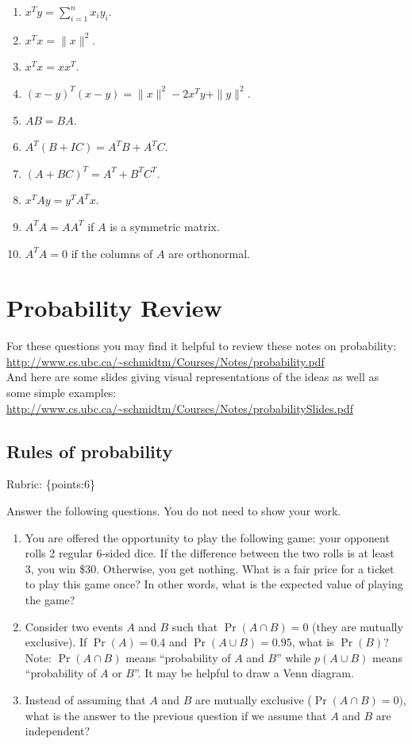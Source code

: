 \documentclass{article}
\def\rubric#1{\gre{Rubric: \{#1\}}}{}
\def\blu#1{{\color{blu}#1}}
\def\gre#1{{\color{gre}#1}}
\def\norm#1{\|#1\|}
\begin{document}
	\begin{enumerate}
		\item $x^Ty = \sum_{i=1}^n x_iy_i$.
		\item $x^Tx = \norm{x}^2$.
		\item $x^Tx = xx^T$.
		\item $(x-y)^T(x-y) = \norm{x}^2 - 2x^Ty + \norm{y}^2$.
		\item $AB=BA$.
		\item $A^T(B + IC) = A^TB + A^TC$.
		\item $(A + BC)^T = A^T + B^TC^T$.
		\item $x^TAy = y^TA^Tx$.
		\item $A^TA = AA^T$ if $A$ is a symmetric matrix.
		\item $A^TA = 0$ if the columns of $A$ are orthonormal.
	\end{enumerate}

	\section{Probability Review}


	For these questions you may find it helpful to review these notes on probability:\\
	\url{http://www.cs.ubc.ca/~schmidtm/Courses/Notes/probability.pdf}\\
	And here are some slides giving visual representations of the ideas as well as some simple examples:\\
	\url{http://www.cs.ubc.ca/~schmidtm/Courses/Notes/probabilitySlides.pdf}

	\subsection{Rules of probability}
	\rubric{points:6}

	\blu{Answer the following questions.} You do not need to show your work.


	\begin{enumerate}
		\item You are offered the opportunity to play the following game: your opponent rolls 2 regular 6-sided dice. If the difference between the two rolls is at least 3, you win \$30. Otherwise, you get nothing. What is a fair price for a ticket to play this game once? In other words, what is the expected value of playing the game?
		\item Consider two events $A$ and $B$ such that $\Pr(A \cap B)=0$ (they are mutually exclusive). If $\Pr(A) = 0.4$ and $\Pr(A \cup B) = 0.95$, what is $\Pr(B)$? Note: $\Pr(A \cap B)$ means
		``probability of $A$ and $B$'' while $p(A \cup B)$ means ``probability of $A$ or $B$''. It may be helpful to draw a Venn diagram.
		\item Instead of assuming that $A$ and $B$ are mutually exclusive ($\Pr(A \cap B) = 0)$, what is the answer to the previous question if we assume that $A$ and $B$ are independent?

	\end{enumerate}
\end{document}
